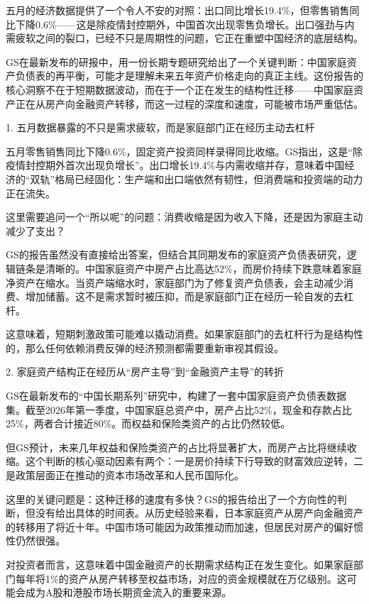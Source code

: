 \documentclass[11pt]{ctexart}
\begin{document}
五月的经济数据提供了一个令人不安的对照：出口同比增长19.4\%，但零售销售同比下降0.6\%——这是除疫情封控期外，中国首次出现零售负增长。出口强劲与内需疲软之间的裂口，已经不只是周期性的问题，它正在重塑中国经济的底层结构。

GS在最新发布的研报中，用一份长期专题研究给出了一个关键判断：中国家庭资产负债表的再平衡，可能才是理解未来五年资产价格走向的真正主线。这份报告的核心洞察不在于短期数据波动，而在于一个正在发生的结构性迁移——中国家庭资产正在从房产向金融资产转移，而这一过程的深度和速度，可能被市场严重低估。

1. 五月数据暴露的不只是需求疲软，而是家庭部门正在经历主动去杠杆

五月零售销售同比下降0.6\%，固定资产投资同样录得同比收缩。GS指出，这是“除疫情封控期外首次出现负增长”。出口增长19.4\%与内需收缩并存，意味着中国经济的“双轨”格局已经固化：生产端和出口端依然有韧性，但消费端和投资端的动力正在流失。

这里需要追问一个“所以呢”的问题：消费收缩是因为收入下降，还是因为家庭主动减少了支出？

GS的报告虽然没有直接给出答案，但结合其同期发布的家庭资产负债表研究，逻辑链条是清晰的。中国家庭资产中房产占比高达52\%，而房价持续下跌意味着家庭净资产在缩水。当资产端缩水时，家庭部门为了修复资产负债表，会主动减少消费、增加储蓄。这不是需求暂时被压抑，而是家庭部门正在经历一轮自发的去杠杆。

这意味着，短期刺激政策可能难以撬动消费。如果家庭部门的去杠杆行为是结构性的，那么任何依赖消费反弹的经济预测都需要重新审视其假设。

2. 家庭资产结构正在经历从“房产主导”到“金融资产主导”的转折

GS在最新发布的“中国长期系列”研究中，构建了一套中国家庭资产负债表数据集。截至2026年第一季度，中国家庭总资产中，房产占比52\%，现金和存款占比25\%，两者合计接近80\%。而权益和保险类资产的占比仍然较低。

但GS预计，未来几年权益和保险类资产的占比将显著扩大，而房产占比将继续收缩。这个判断的核心驱动因素有两个：一是房价持续下行导致的财富效应逆转，二是政策层面正在推动的资本市场改革和人民币国际化。

这里的关键问题是：这种迁移的速度有多快？GS的报告给出了一个方向性的判断，但没有给出具体的时间表。从历史经验来看，日本家庭资产从房产向金融资产的转移用了将近十年。中国市场可能因为政策推动而加速，但居民对房产的偏好惯性仍然很强。

对投资者而言，这意味着中国金融资产的长期需求结构正在发生变化。如果家庭部门每年将1\%的资产从房产转移至权益市场，对应的资金规模就在万亿级别。这可能会成为A股和港股市场长期资金流入的重要来源。
\end{document}
